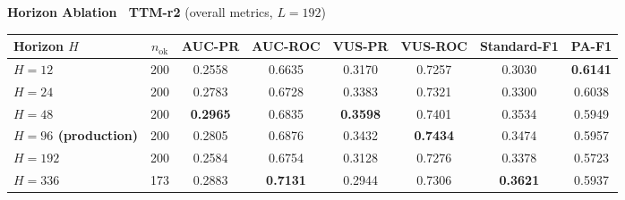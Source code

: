 \documentclass[border=2pt,varwidth=\maxdimen]{standalone}
\begin{document}
\begin{center}
\textbf{\large Horizon Ablation \textemdash\ TTM-r2} \quad (overall metrics, $L=192$)\par\vspace{6pt}
\renewcommand{\arraystretch}{1.1}
\setlength{\tabcolsep}{6pt}
\small

\begin{tabular}{l|c|cccccc}
\toprule
\textbf{Horizon $H$} & \textbf{$n_\textrm{ok}$} & \textbf{AUC-PR} & \textbf{AUC-ROC} & \textbf{VUS-PR} & \textbf{VUS-ROC} & \textbf{Standard-F1} & \textbf{PA-F1} \\
\midrule
\textbf{$H=12$}  & 200 & 0.2558 & 0.6635 & 0.3170 & 0.7257 & 0.3030 & \textbf{0.6141} \\
\textbf{$H=24$}  & 200 & 0.2783 & 0.6728 & 0.3383 & 0.7321 & 0.3300 & 0.6038 \\
\textbf{$H=48$}  & 200 & \textbf{0.2965} & 0.6835 & \textbf{0.3598} & 0.7401 & 0.3534 & 0.5949 \\
\textbf{$H=96$ (production)}  & 200 & 0.2805 & 0.6876 & 0.3432 & \textbf{0.7434} & 0.3474 & 0.5957 \\
\textbf{$H=192$}  & 200 & 0.2584 & 0.6754 & 0.3128 & 0.7276 & 0.3378 & 0.5723 \\
\textbf{$H=336$}  & 173 & 0.2883 & \textbf{0.7131} & 0.2944 & 0.7306 & \textbf{0.3621} & 0.5937 \\
\bottomrule
\end{tabular}
\end{center}
\end{document}

